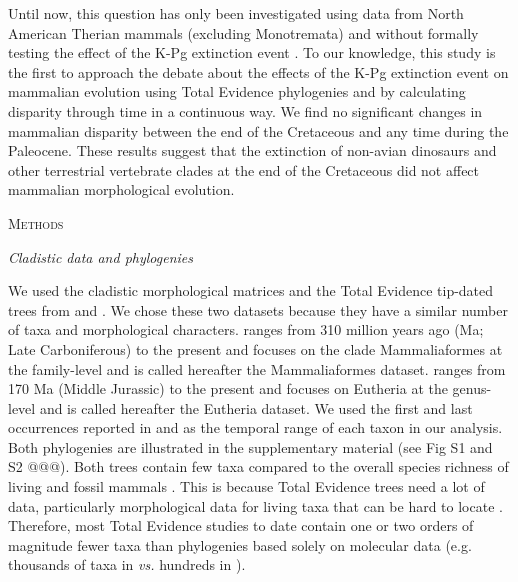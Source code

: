 \documentclass[12pt,letterpaper]{article}
\renewcommand{\section}[1]{%
\bigskip
\begin{center}
\begin{Large}
\normalfont\scshape #1
\medskip
\end{Large}
\end{center}}
\renewcommand{\subsection}[1]{%
\bigskip
\begin{center}
\begin{large}
\normalfont\itshape #1
\end{large}
\end{center}}
\begin{document}
Until now, this question has only been investigated using data from North American Therian mammals (excluding Monotremata) and without formally testing the effect of the K-Pg extinction event \citep{Wilson2013}.
To our knowledge, this study is the first to approach the debate about the effects of the K-Pg extinction event on mammalian evolution using Total Evidence phylogenies and by calculating disparity through time in a continuous way.
We find no significant changes in mammalian disparity between the end of the Cretaceous and any time during the Paleocene. 
These results suggest that the extinction of non-avian dinosaurs and other terrestrial vertebrate clades at the end of the Cretaceous did not affect mammalian morphological evolution.

%
%

\section{Methods}

\subsection{Cladistic data and phylogenies}
We used the cladistic morphological matrices and the Total Evidence tip-dated trees \citep{ronquista2012} from \citet[][103 taxa with 446 morphological characters;]{Slater2012MEE} and \citet[][102 taxa with 421 morphological characters]{beckancient2014}.
We chose these two datasets because they have a similar number of taxa and morphological characters.
\cite{Slater2012MEE} ranges from 310 million years ago (Ma; Late Carboniferous) to the present and focuses on the clade Mammaliaformes at the family-level and is called hereafter the Mammaliaformes dataset.
\cite{beckancient2014} ranges from 170 Ma (Middle Jurassic) to the present and focuses on Eutheria at the genus-level and is called hereafter the Eutheria dataset.
We used the first and last occurrences reported in \cite{Slater2012MEE} and \cite{beckancient2014} as the temporal range of each taxon in our analysis.
Both phylogenies are illustrated in the supplementary material (see Fig S1 and S2 @@@).
Both trees contain few taxa compared to the overall species richness of living and fossil mammals \citep{bininda2007delayed,archibald2011extinction}.
This is because Total Evidence trees need a lot of data, particularly morphological data for living taxa that can be hard to locate \citep{GuillermeCooper}.
Therefore, most Total Evidence studies to date contain one or two orders of magnitude fewer taxa than phylogenies based solely on molecular data (e.g. thousands of taxa in \citealt{bininda2007delayed,meredithimpacts2011} \textit{vs.} hundreds in \citealt{ronquista2012,Slater2012MEE,Wood01032013,beckancient2014}).
\end{document}
